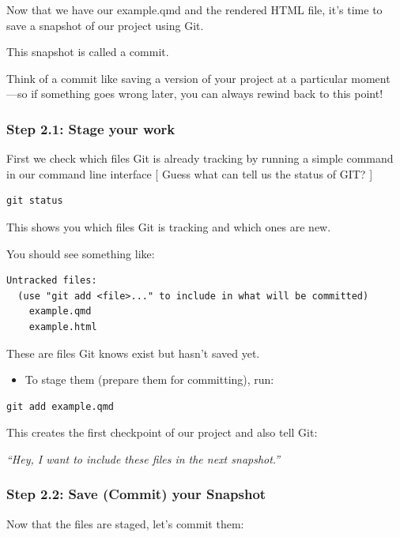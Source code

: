 \documentclass[
  11pt,
  a4paper,
]{article}
\providecommand{\tightlist}{%
  \setlength{\itemsep}{0pt}\setlength{\parskip}{0pt}}\usepackage{longtable,booktabs,array}
\begin{document}
Now that we have our example.qmd and the rendered HTML file, it's time
to save a snapshot of our project using Git.

This snapshot is called a commit.

Think of a commit like saving a version of your project at a particular
moment ---so if something goes wrong later, you can always rewind back
to this point!

\subsubsection{Step 2.1: Stage your
work}\label{step-2.1-stage-your-work}

First we check which files Git is already tracking by running a simple
command in our command line interface {[} Guess what can tell us the
status of GIT? {]}

\begin{verbatim}
git status 
\end{verbatim}

This shows you which files Git is tracking and which ones are new.

You should see something like:

\begin{verbatim}
Untracked files:
  (use "git add <file>..." to include in what will be committed)
    example.qmd
    example.html
\end{verbatim}

These are files Git knows exist but hasn't saved yet.

\begin{itemize}
\tightlist
\item
  To stage them (prepare them for committing), run:
\end{itemize}

\begin{verbatim}
git add example.qmd 
\end{verbatim}

This creates the first checkpoint of our project and also tell Git:

\emph{``Hey, I want to include these files in the next snapshot.''}

\subsubsection{Step 2.2: Save (Commit) your
Snapshot}\label{step-2.2-save-commit-your-snapshot}

Now that the files are staged, let's commit them:
\end{document}
